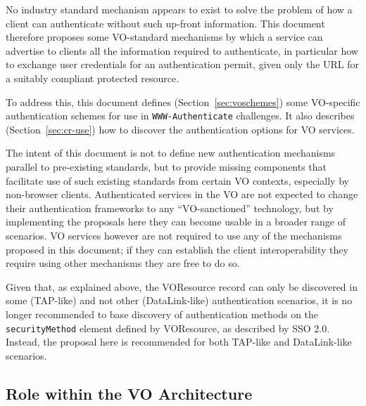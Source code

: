 \documentclass[11pt,a4paper]{ivoa}
\newcommand{\header}[1]{{\tt #1}}
\begin{document}
No industry standard mechanism appears to exist to solve the
problem of how a client can authenticate without such up-front
information.
This document therefore proposes some VO-standard mechanisms
by which a service can advertise to clients all the information
required to authenticate,
in particular how to exchange user credentials for an authentication permit,
given only the URL for a suitably compliant protected resource.

To address this, this document defines (Section~\ref{sec:voschemes})
some VO-specific authentication schemes
for use in \header{WWW-Authenticate} challenges.
It also describes (Section~\ref{sec:cr-use}) how to discover the
authentication options for VO services.

The intent of this document is not to define new authentication
mechanisms parallel to pre-existing standards, but to provide
missing components that facilitate use of such existing standards
from certain VO contexts, especially by non-browser clients.
Authenticated services in the VO are not expected to change their
authentication frameworks to any ``VO-sanctioned'' technology,
but by implementing the proposals here they can become usable
in a broader range of scenarios.
VO services however are not required to use any of the  
mechanisms proposed in this document; if they can establish the
client interoperability they require using other mechanisms
they are free to do so.

Given that, as explained above,
the VOResource record can only be discovered in some (TAP-like)
and not other (DataLink-like) authentication scenarios,
it is no longer recommended to base discovery of authentication methods
on the {\tt securityMethod} element
defined by VOResource, as described by SSO 2.0.
Instead, the proposal here is recommended for both TAP-like and DataLink-like
scenarios.

\subsection{Role within the VO Architecture}
\end{document}
